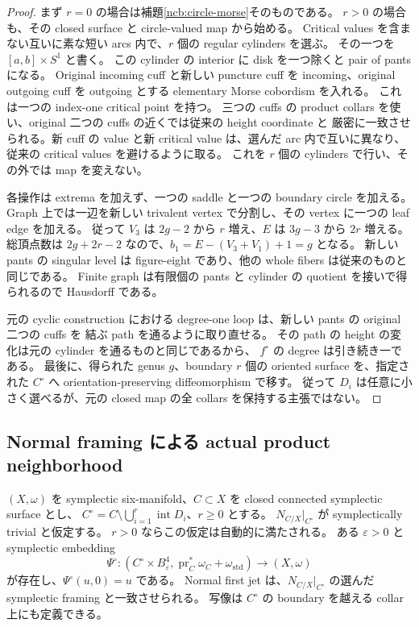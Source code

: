 \begin{proof}
まず $r=0$ の場合は補題\ref{ncb:circle-morse}そのものである。
$r>0$ の場合も、その closed surface と circle-valued map から始める。
Critical values を含まない互いに素な短い arcs 内で、$r$ 個の regular cylinders を選ぶ。
その一つを $[a,b]\times S^1$ と書く。
この cylinder の interior に disk を一つ除くと pair of pants になる。
Original incoming cuff と新しい puncture cuff を incoming、original outgoing cuff を outgoing とする
elementary Morse cobordism を入れる。
これは一つの index-one critical point を持つ。
三つの cuffs の product collars を使い、original 二つの cuffs の近くでは従来の height coordinate と
厳密に一致させられる。新 cuff の value と新 critical value は、選んだ arc 内で互いに異なり、
従来の critical values を避けるように取る。
これを $r$ 個の cylinders で行い、その外では map を変えない。

各操作は extrema を加えず、一つの saddle と一つの boundary circle を加える。
Graph 上では一辺を新しい trivalent vertex で分割し、その vertex に一つの leaf edge を加える。
従って $V_3$ は $2g-2$ から $r$ 増え、$E$ は $3g-3$ から $2r$ 増える。
総頂点数は $2g+2r-2$ なので、$b_1=E-(V_3+V_1)+1=g$ となる。
新しい pants の singular level は figure-eight であり、他の whole fibers は従来のものと同じである。
Finite graph は有限個の pants と cylinder の quotient を接いで得られるので Hausdorff である。

元の cyclic construction における degree-one loop は、新しい pants の original 二つの cuffs を
結ぶ path を通るように取り直せる。
その path の height の変化は元の cylinder を通るものと同じであるから、
$f^\circ$ の degree は引き続き一である。
最後に、得られた genus $g$、boundary $r$ 個の oriented surface を、指定された $C^\circ$ へ
orientation-preserving diffeomorphism で移す。
従って $D_i$ は任意に小さく選べるが、元の closed map の全 collars を保持する主張ではない。
\end{proof}

\subsection{Normal framing による actual product neighborhood}

\begin{lemma}\label{fhr:product-neighborhood}
$(X,\omega)$ を symplectic six-manifold、$C\subset X$ を closed connected symplectic surface とし、
$C^\circ=C\setminus\bigcup_{i=1}^r\operatorname{int}D_i$、$r\ge0$ とする。
$N_{C/X}|_{C^\circ}$ が symplectically trivial と仮定する。
$r>0$ ならこの仮定は自動的に満たされる。
ある $\varepsilon>0$ と symplectic embedding
\begin{equation}\label{fhr:product-embedding}
 \Psi^\circ:
 (C^\circ\times B^4_\varepsilon,
      \operatorname{pr}_C^*\omega_C+\omega_{\mathrm{std}})
 \longrightarrow (X,\omega)
\end{equation}
が存在し、$\Psi^\circ(u,0)=u$ である。
Normal first jet は、$N_{C/X}|_{C^\circ}$ の選んだ symplectic framing と一致させられる。
写像は $C^\circ$ の boundary を越える collar 上にも定義できる。
\end{lemma}

